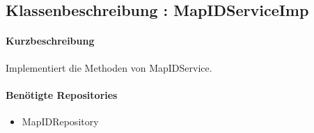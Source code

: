 \subsection*{Klassenbeschreibung : MapIDServiceImp}%
\paragraph*{Kurzbeschreibung}
Implementiert die Methoden von MapIDService.
\paragraph*{Benötigte Repositories}
\begin{itemize}
    \item MapIDRepository
\end{itemize}
